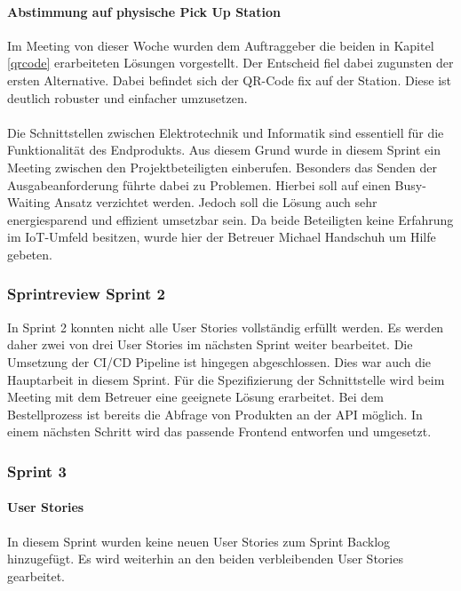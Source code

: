 \paragraph{Abstimmung auf physische Pick Up Station}\label{abstimmungPickUp}
Im Meeting von dieser Woche wurden dem Auftraggeber die beiden in Kapitel \ref{qrcode} erarbeiteten Lösungen vorgestellt. Der Entscheid fiel dabei zugunsten der ersten Alternative. Dabei befindet sich der QR-Code fix auf der Station. Diese ist deutlich robuster und einfacher umzusetzen. \\\\
Die Schnittstellen zwischen Elektrotechnik und Informatik sind essentiell für die Funktionalität des Endprodukts. Aus diesem Grund wurde in diesem Sprint ein Meeting zwischen den Projektbeteiligten einberufen. Besonders das Senden der Ausgabeanforderung führte dabei zu Problemen. Hierbei soll auf einen Busy-Waiting Ansatz verzichtet werden. Jedoch soll die Lösung auch sehr energiesparend und effizient umsetzbar sein. Da beide Beteiligten keine Erfahrung im \ac{IoT}-Umfeld besitzen, wurde hier der Betreuer Michael Handschuh um Hilfe gebeten. 


\subsubsection{Sprintreview Sprint 2}
In Sprint 2 konnten nicht alle User Stories vollständig erfüllt werden. Es werden daher zwei von drei User Stories im nächsten Sprint weiter bearbeitet. Die Umsetzung der CI/CD Pipeline ist hingegen abgeschlossen. Dies war auch die Hauptarbeit in diesem Sprint. Für die Spezifizierung der Schnittstelle wird beim Meeting mit dem Betreuer eine geeignete Lösung erarbeitet. Bei dem Bestellprozess ist bereits die Abfrage von Produkten an der API möglich. In einem nächsten Schritt wird das passende Frontend entworfen und umgesetzt. 

\subsubsection{Sprint 3}
\paragraph{User Stories}
In diesem Sprint wurden keine neuen User Stories zum Sprint Backlog hinzugefügt. Es wird weiterhin an den beiden verbleibenden User Stories gearbeitet. 


